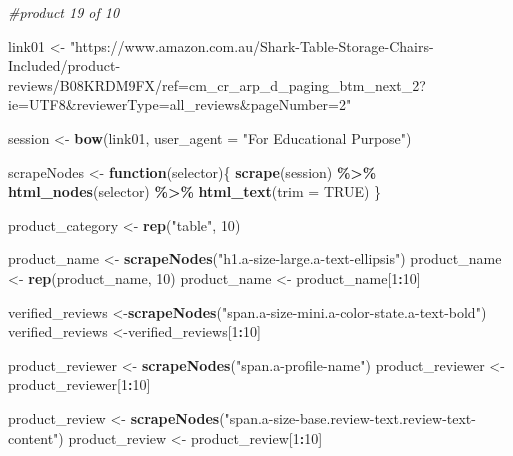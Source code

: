 \documentclass[
]{article}
\newenvironment{Shaded}{\begin{snugshade}}{\end{snugshade}}
\newcommand{\AttributeTok}[1]{\textcolor[rgb]{0.13,0.29,0.53}{#1}}
\newcommand{\CommentTok}[1]{\textcolor[rgb]{0.56,0.35,0.01}{\textit{#1}}}
\newcommand{\ConstantTok}[1]{\textcolor[rgb]{0.56,0.35,0.01}{#1}}
\newcommand{\ControlFlowTok}[1]{\textcolor[rgb]{0.13,0.29,0.53}{\textbf{#1}}}
\newcommand{\DecValTok}[1]{\textcolor[rgb]{0.00,0.00,0.81}{#1}}
\newcommand{\FunctionTok}[1]{\textcolor[rgb]{0.13,0.29,0.53}{\textbf{#1}}}
\newcommand{\NormalTok}[1]{#1}
\newcommand{\OtherTok}[1]{\textcolor[rgb]{0.56,0.35,0.01}{#1}}
\newcommand{\SpecialCharTok}[1]{\textcolor[rgb]{0.81,0.36,0.00}{\textbf{#1}}}
\newcommand{\StringTok}[1]{\textcolor[rgb]{0.31,0.60,0.02}{#1}}
\begin{document}
\begin{Shaded}
\begin{Highlighting}[]
\CommentTok{\#product 19 of 10}

\NormalTok{link01 }\OtherTok{\textless{}{-}} \StringTok{"https://www.amazon.com.au/Shark{-}Table{-}Storage{-}Chairs{-}Included/product{-}reviews/B08KRDM9FX/ref=cm\_cr\_arp\_d\_paging\_btm\_next\_2?ie=UTF8\&reviewerType=all\_reviews\&pageNumber=2"}


\NormalTok{  session }\OtherTok{\textless{}{-}} \FunctionTok{bow}\NormalTok{(link01,}
               \AttributeTok{user\_agent =} \StringTok{"For Educational Purpose"}\NormalTok{)}

\NormalTok{  scrapeNodes }\OtherTok{\textless{}{-}} \ControlFlowTok{function}\NormalTok{(selector)\{}
    \FunctionTok{scrape}\NormalTok{(session) }\SpecialCharTok{\%\textgreater{}\%}
      \FunctionTok{html\_nodes}\NormalTok{(selector) }\SpecialCharTok{\%\textgreater{}\%}
      \FunctionTok{html\_text}\NormalTok{(}\AttributeTok{trim =} \ConstantTok{TRUE}\NormalTok{)}
\NormalTok{  \}}

\NormalTok{  product\_category }\OtherTok{\textless{}{-}} \FunctionTok{rep}\NormalTok{(}\StringTok{"table"}\NormalTok{, }\DecValTok{10}\NormalTok{)}

\NormalTok{  product\_name }\OtherTok{\textless{}{-}} \FunctionTok{scrapeNodes}\NormalTok{(}\StringTok{"h1.a{-}size{-}large.a{-}text{-}ellipsis"}\NormalTok{)}
\NormalTok{  product\_name }\OtherTok{\textless{}{-}} \FunctionTok{rep}\NormalTok{(product\_name, }\DecValTok{10}\NormalTok{)}
\NormalTok{  product\_name }\OtherTok{\textless{}{-}}\NormalTok{ product\_name[}\DecValTok{1}\SpecialCharTok{:}\DecValTok{10}\NormalTok{]}
  
\NormalTok{  verified\_reviews }\OtherTok{\textless{}{-}}\FunctionTok{scrapeNodes}\NormalTok{(}\StringTok{"span.a{-}size{-}mini.a{-}color{-}state.a{-}text{-}bold"}\NormalTok{)}
\NormalTok{  verified\_reviews }\OtherTok{\textless{}{-}}\NormalTok{verified\_reviews[}\DecValTok{1}\SpecialCharTok{:}\DecValTok{10}\NormalTok{]}
  
\NormalTok{  product\_reviewer }\OtherTok{\textless{}{-}} \FunctionTok{scrapeNodes}\NormalTok{(}\StringTok{"span.a{-}profile{-}name"}\NormalTok{)}
\NormalTok{  product\_reviewer }\OtherTok{\textless{}{-}}\NormalTok{ product\_reviewer[}\DecValTok{1}\SpecialCharTok{:}\DecValTok{10}\NormalTok{]}
  
\NormalTok{  product\_review }\OtherTok{\textless{}{-}} \FunctionTok{scrapeNodes}\NormalTok{(}\StringTok{"span.a{-}size{-}base.review{-}text.review{-}text{-}content"}\NormalTok{)}
\NormalTok{  product\_review }\OtherTok{\textless{}{-}}\NormalTok{ product\_review[}\DecValTok{1}\SpecialCharTok{:}\DecValTok{10}\NormalTok{]}
  

\end{Highlighting}
\end{Shaded}
\end{document}
